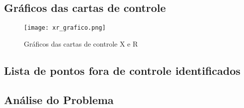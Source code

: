 \documentclass[12pt]{article}
\begin{document}
\subsection*{Gráficos das cartas de controle}

\begin{figure}[H]
    \centering
    \texttt{[image: xr\_grafico.png]}
    \caption{Gráficos das cartas de controle X e R}
    \label{fig:placeholder}
\end{figure}

\subsection*{Lista de pontos fora de controle identificados}

\subsection*{Análise do Problema}
\end{document}
